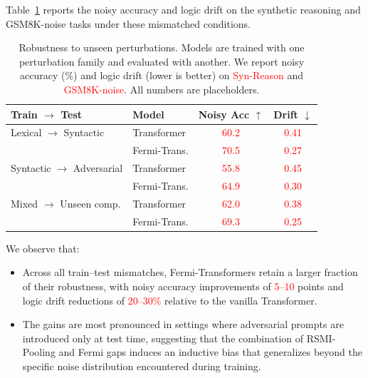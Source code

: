 \documentclass{article}
\newcommand{\TODO}[1]{\textcolor{red}{#1}}
\begin{document}
Table~\ref{tab:unseen} reports the noisy accuracy and logic drift on the synthetic reasoning and GSM8K-noise tasks under these mismatched conditions.

\begin{table}[t]
    \centering
    \small
    \caption{
    Robustness to unseen perturbations.
    Models are trained with one perturbation family and evaluated with another. 
    We report noisy accuracy (\%) and logic drift (lower is better) on \TODO{Syn-Reason} and \TODO{GSM8K-noise}. 
    All numbers are placeholders.
    }
    \label{tab:unseen}
    \begin{tabular}{l l c c}
        \toprule
        Train $\rightarrow$ Test & Model & Noisy Acc $\uparrow$ & Drift $\downarrow$ \\
        \midrule
        Lexical $\rightarrow$ Syntactic &
        Transformer &
        \TODO{60.2} &
        \TODO{0.41} \\
        & Fermi-Trans. &
        \TODO{70.5} &
        \TODO{0.27} \\
        \midrule
        Syntactic $\rightarrow$ Adversarial &
        Transformer &
        \TODO{55.8} &
        \TODO{0.45} \\
        & Fermi-Trans. &
        \TODO{64.9} &
        \TODO{0.30} \\
        \midrule
        Mixed $\rightarrow$ Unseen comp. &
        Transformer &
        \TODO{62.0} &
        \TODO{0.38} \\
        & Fermi-Trans. &
        \TODO{69.3} &
        \TODO{0.25} \\
        \bottomrule
    \end{tabular}
\end{table}

We observe that:
\begin{itemize}[leftmargin=*]
    \item Across all train--test mismatches, Fermi-Transformers retain a larger fraction of their robustness, with noisy accuracy improvements of \TODO{5--10} points and logic drift reductions of \TODO{20--30\%} relative to the vanilla Transformer.
    \item The gains are most pronounced in settings where adversarial prompts are introduced only at test time, suggesting that the combination of RSMI-Pooling and Fermi gaps induces an inductive bias that generalizes beyond the specific noise distribution encountered during training.
\end{itemize}
\end{document}
